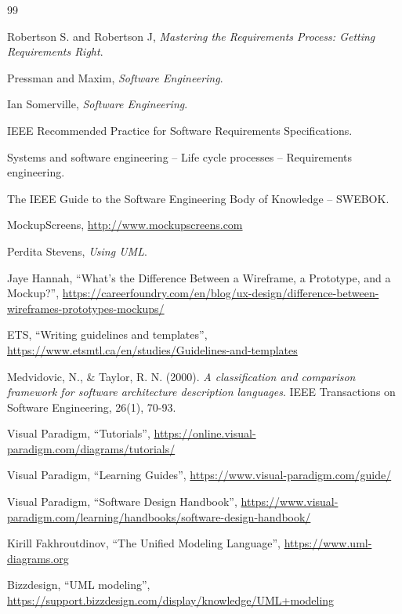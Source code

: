 \begin{thebibliography}{99}

 Robertson S. and Robertson J, \textit{Mastering the Requirements Process: Getting Requirements Right}.

 Pressman and Maxim, \textit{Software Engineering}.

 Ian Somerville, \textit{Software Engineering}.

 IEEE Recommended Practice for Software Requirements Specifications.

 Systems and software engineering -- Life cycle processes -- Requirements engineering.

 The IEEE Guide to the Software Engineering Body of Knowledge -- SWEBOK.

 MockupScreens, \url{http://www.mockupscreens.com}

 Perdita Stevens, \textit{Using UML}.

 Jaye Hannah, ``What's the Difference Between a Wireframe, a Prototype, and a Mockup?'', \url{https://careerfoundry.com/en/blog/ux-design/difference-between-wireframes-prototypes-mockups/}

 ETS, ``Writing guidelines and templates'', \url{https://www.etsmtl.ca/en/studies/Guidelines-and-templates}

 Medvidovic, N., \& Taylor, R. N. (2000). \textit{A classification and comparison framework for software architecture description languages}. IEEE Transactions on Software Engineering, 26(1), 70-93.

 Visual Paradigm, ``Tutorials'', \url{https://online.visual-paradigm.com/diagrams/tutorials/}

 Visual Paradigm, ``Learning Guides'', \url{https://www.visual-paradigm.com/guide/}

 Visual Paradigm, ``Software Design Handbook'', \url{https://www.visual-paradigm.com/learning/handbooks/software-design-handbook/}

 Kirill Fakhroutdinov, ``The Unified Modeling Language'', \url{https://www.uml-diagrams.org}

 Bizzdesign, ``UML modeling'', \url{https://support.bizzdesign.com/display/knowledge/UML+modeling}


\end{thebibliography}

